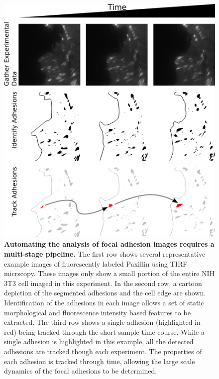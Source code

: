\begin{figure}[htbp]
\begin{center}
\includegraphics[width=\textwidth]{../figures/FA_workflow/graphic_workflow}
\end{center}
\caption{
{\bf Automating the analysis of focal adhesion images requires a multi-stage
pipeline.} The first row shows several representative example images of
fluorescently labeled Paxillin using TIRF micrscopy. These images only show a
small portion of the entire NIH 3T3 cell imaged in this experiment. In the
second row, a cartoon depiction of the segmented adhesions and the cell edge
are shown. Identification of the adhesions in each image allows a set of static
morphological and fluorescence intensity based features to be extracted. The
third row shows a single adhesion (highlighted in red) being tracked through
the short sample time course. While a single adhesion is highlighted in this
example, all the detected adhesions are tracked though each experiment. The
properties of each adhesion is tracked through time, allowing the large scale
dynamics of the focal adhesions to be determined.  
}
\label{method_flow}
\end{figure}

